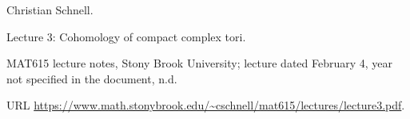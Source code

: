 Christian Schnell.

\newblock Lecture 3: Cohomology of compact complex tori.

\newblock MAT615 lecture notes, Stony Brook University;\allowbreak{} lecture dated February
  4, year not specified in the document, n.d.

\newblock URL
  \url{https://www.math.stonybrook.edu/~cschnell/mat615/lectures/lecture3.pdf}.

